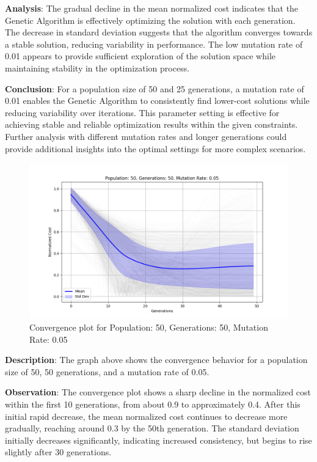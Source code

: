 \documentclass{article}
\begin{document}
    \textbf{Analysis}: The gradual decline in the mean normalized cost indicates that the Genetic Algorithm is effectively optimizing the solution with each generation. The decrease in standard deviation suggests that the algorithm converges towards a stable solution, reducing variability in performance. The low mutation rate of 0.01 appears to provide sufficient exploration of the solution space while maintaining stability in the optimization process.

    \textbf{Conclusion}: For a population size of 50 and 25 generations, a mutation rate of 0.01 enables the Genetic Algorithm to consistently find lower-cost solutions while reducing variability over iterations. This parameter setting is effective for achieving stable and reliable optimization results within the given constraints. Further analysis with different mutation rates and longer generations could provide additional insights into the optimal settings for more complex scenarios.

    \begin{figure}[H]
        \centering
        \includegraphics[width=\textwidth]{genetic_algorithm/Population_50_Generations_50_MutationRate_0.05}
        \caption{Convergence plot for Population: 50, Generations: 50, Mutation Rate: 0.05}
        \label{fig:ga_50_50_05}
    \end{figure}

    \textbf{Description}: The graph above shows the convergence behavior for a population size of 50, 50 generations, and a mutation rate of 0.05.

    \textbf{Observation}: The convergence plot shows a sharp decline in the normalized cost within the first 10 generations, from about 0.9 to approximately 0.4. After this initial rapid decrease, the mean normalized cost continues to decrease more gradually, reaching around 0.3 by the 50th generation. The standard deviation initially decreases significantly, indicating increased consistency, but begins to rise slightly after 30 generations.
\end{document}
